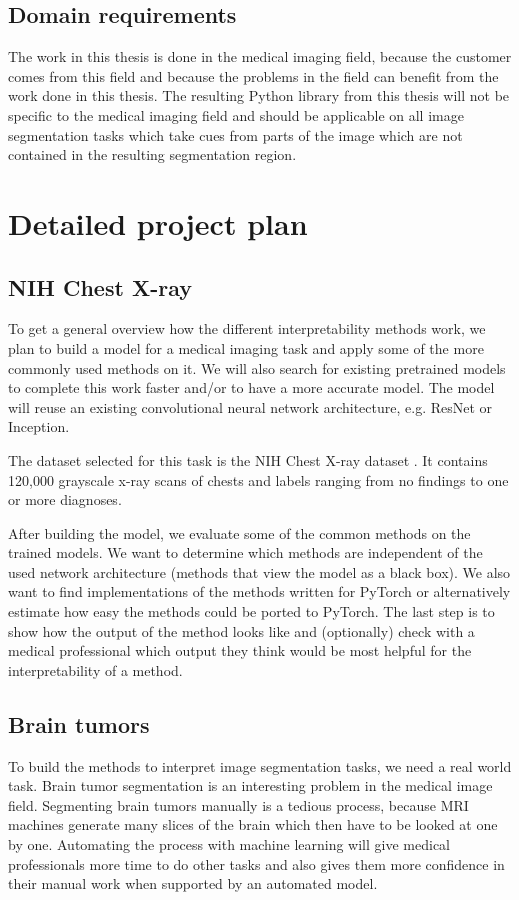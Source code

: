 \subsection{Domain requirements}
The work in this thesis is done in the medical imaging field, because the customer comes from this field and because the problems in the field can benefit from the
work done in this thesis. The resulting Python library from this thesis will not be specific to the medical imaging field and should be applicable on all image segmentation tasks which take cues from parts of the image which are not contained in the resulting segmentation region.

\section{Detailed project plan}
\subsection{NIH Chest X-ray}
To get a general overview how the different interpretability methods work, we plan to build a model for a medical imaging task and apply some of the more commonly used methods on it. We will also search for existing pretrained models to complete this work faster and/or to have a more accurate model. The model will reuse an existing convolutional neural network architecture, e.g. ResNet or Inception.

The dataset selected for this task is the NIH Chest X-ray dataset \cite{wang2017chestx}. It contains 120,000 grayscale x-ray scans of chests and labels ranging from no findings to one or more diagnoses.

After building the model, we evaluate some of the common methods on the trained models. We want to determine which methods are independent of the used network architecture (methods that view the model as a black box). We also want to find implementations of the methods written for PyTorch or alternatively estimate how easy the methods could be ported to PyTorch. The last step is to show how the output of the method looks like and (optionally) check with a medical professional which output they think would be most helpful for the interpretability of a method.

\subsection{Brain tumors}
To build the methods to interpret image segmentation tasks, we need a real world task. Brain tumor segmentation is an interesting problem in the medical image field. Segmenting brain tumors manually is a tedious process, because MRI machines generate many slices of the brain which then have to be looked at one by one. Automating the process with machine learning will give medical professionals more time to do other tasks and also gives them more confidence in their manual work when supported by an automated model.

